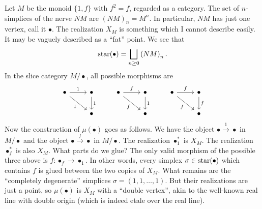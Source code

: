 \begin{example}
\label{ST of the 2-element monoid category}
Let $M$ be the monoid $\{1,f\}$ with $f^2 = f$, regarded as a category. The set of $n$-simplices of the nerve $NM$ are $(NM)_n = M^n$. In particular, $NM$ has just one vertex, call it $\bullet$. The realization $X_M$ is something which I cannot describe easily. It may be vaguely described as a ``fat'' point. We see that
\[ \operatorname{star}(\bullet) = \bigsqcup_{n \geq 0} \left(NM\right)_n. \]
In the slice category $M / \bullet$, all possible morphisms are
\[ \begin{tikzcd}
\bullet \arrow[swap]{dr}{1} \arrow{r}{1} & \bullet \arrow{d}{1} & \bullet \arrow[swap]{dr}{f} \arrow{r}{f} & \bullet \arrow{d}{1} & \bullet \arrow[swap]{dr}{f} \arrow{r}{f} & \bullet \arrow{d}{f} \\
& \bullet & & \bullet & & \bullet
\end{tikzcd} \]
Now the construction of $\mu(\bullet)$ goes as follows. We have the object $\bullet \xrightarrow{1} \bullet$ in $M/\bullet$ and the object $\bullet \xrightarrow{f} \bullet$ in $M/\bullet$. The realization $\bullet_1^*$ is $X_M$. The realization $\bullet_f^*$ is also $X_M$. What parts do we glue? The only valid morphism of the possible three above is $f : \bullet_f \to \bullet_1$. In other words, every simplex $\sigma \in \operatorname{star}(\bullet)$ which contains $f$ is glued between the two copies of $X_M$. What remains are the ``completely degenerate'' simplices $\sigma = (1,1,\ldots,1)$. But their realizations are just a point, so $\mu(\bullet)$ is $X_M$ with a ``double vertex'', akin to the well-known real line with double origin (which is indeed etale over the real line).
\end{example}


